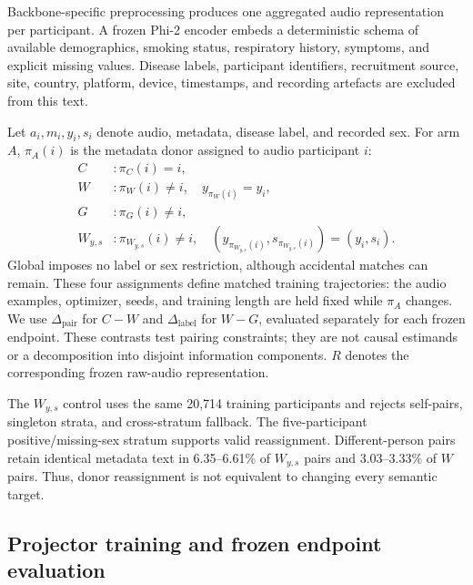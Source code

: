 \documentclass{article}
\newcommand{\dpair}{\ensuremath{\Delta_{\mathrm{pair}}}}
\newcommand{\dlabel}{\ensuremath{\Delta_{\mathrm{label}}}}
\newcommand{\wys}{\ensuremath{W_{y,s}}}
\begin{document}
Backbone-specific preprocessing produces one aggregated audio representation
per participant. A frozen Phi-2 encoder \cite{javaheripi2023phi2} embeds a
deterministic schema of available demographics, smoking status, respiratory
history, symptoms, and explicit missing values. Disease labels, participant
identifiers, recruitment source, site, country, platform, device, timestamps,
and recording artefacts are excluded from this text.

Let $a_i,m_i,y_i,s_i$ denote audio, metadata, disease label, and recorded sex.
For arm $A$, $\pi_A(i)$ is the metadata donor assigned to audio participant $i$:
\begin{equation}
\begin{aligned}
 C &: \pi_C(i)=i,\\
 W &: \pi_W(i)\ne i,\quad y_{\pi_W(i)}=y_i,\\
 G &: \pi_G(i)\ne i,\\
 \wys{} &: \pi_{W_{y,s}}(i)\ne i,\quad
          (y_{\pi_{W_{y,s}}(i)},s_{\pi_{W_{y,s}}(i)})=(y_i,s_i).
\end{aligned}
\label{eq:pairing}
\end{equation}
Global imposes no label or sex restriction, although accidental matches can
remain. These four assignments define matched training trajectories: the audio
examples, optimizer, seeds, and training length are held fixed while
$\pi_A$ changes. We use \dpair{} for $C-W$ and \dlabel{} for $W-G$, evaluated
separately for each frozen endpoint. These contrasts test pairing constraints;
they are not causal estimands or a decomposition into disjoint information
components. $R$ denotes the corresponding frozen raw-audio representation.

The \wys{} control uses the same 20,714 training participants and rejects
self-pairs, singleton strata, and cross-stratum fallback. The five-participant
positive/missing-sex stratum supports valid reassignment. Different-person
pairs retain identical metadata text in 6.35--6.61\% of \wys{} pairs and
3.03--3.33\% of $W$ pairs. Thus, donor reassignment is not equivalent to
changing every semantic target.

\subsection{Projector training and frozen endpoint evaluation}
\end{document}
